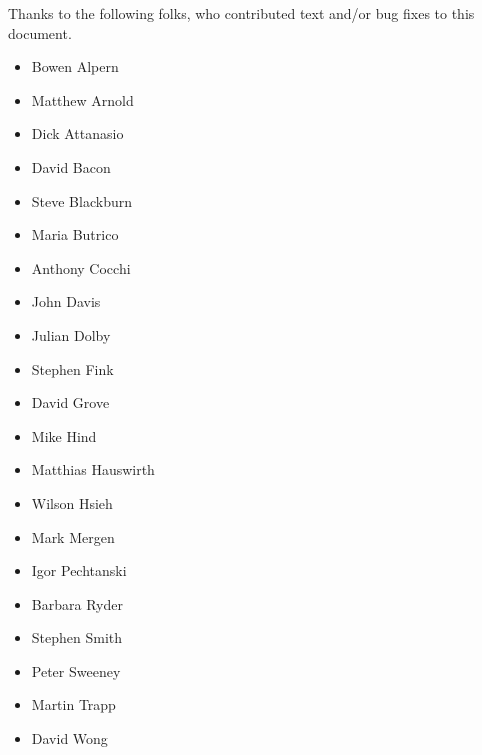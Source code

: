 Thanks to the following folks, who contributed text and/or bug fixes to
this document.

\begin{itemize}
\item Bowen Alpern
\item Matthew Arnold
\item Dick Attanasio
\item David Bacon
\item Steve Blackburn
\item Maria Butrico
\item Anthony Cocchi
\item John Davis
\item Julian Dolby
\item Stephen Fink
\item David Grove
\item Mike Hind
\item Matthias Hauswirth
\item Wilson Hsieh
\item Mark Mergen
\item Igor Pechtanski
\item Barbara Ryder
\item Stephen Smith
\item Peter Sweeney
\item Martin Trapp
\item David Wong
\end{itemize}
